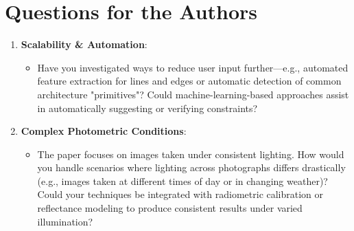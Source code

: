 \documentclass[12pt]{article}
\begin{document}
\section{Questions for the Authors}
\begin{enumerate}[noitemsep]
    \item \textbf{Scalability \& Automation}:
    \begin{itemize}[noitemsep]
        \item Have you investigated ways to reduce user input further—e.g., automated feature extraction for lines and edges or automatic detection of common architecture "primitives"? Could machine-learning-based approaches assist in automatically suggesting or verifying constraints?
    \end{itemize}
    \item \textbf{Complex Photometric Conditions}:
    \begin{itemize}[noitemsep]
        \item The paper focuses on images taken under consistent lighting. How would you handle scenarios where lighting across photographs differs drastically (e.g., images taken at different times of day or in changing weather)? Could your techniques be integrated with radiometric calibration or reflectance modeling to produce consistent results under varied illumination?
    \end{itemize}
\end{enumerate}
\end{document}
